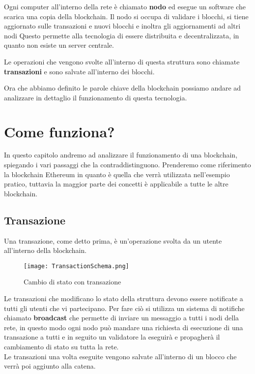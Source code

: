 Ogni computer all'interno della rete è chiamato \textbf{nodo} ed esegue un
software che scarica una copia della blockchain. Il nodo si occupa di validare
i blocchi, si tiene aggiornato sulle transazioni e nuovi blocchi e inoltra gli
aggiornamenti ad altri nodi Questo permette alla tecnologia di essere
distribuita e decentralizzata, in quanto non esiste un server centrale.

Le operazioni che vengono svolte all'interno di questa struttura sono chiamate
\textbf{transazioni} e sono salvate all'interno dei blocchi.

Ora che abbiamo definito le parole chiave della blockchain possiamo andare ad
analizzare in dettaglio il funzionamento di questa tecnologia.

\newpage

\section{Come funziona?}
In questo capitolo andremo ad analizzare il funzionamento di una blockchain,
spiegando i vari passaggi che la contraddistinguono. Prenderemo come
riferimento la blockchain Ethereum in quanto è quella che verrà utilizzata
nell'esempio pratico, tuttavia la maggior parte dei concetti è applicabile 
a tutte le altre blockchain.

\subsection{Transazione}
Una transazione, come detto prima, è un'operazione svolta da un utente
all'interno della blockchain. 

\begin{figure}[H]
    \centering
    \texttt{[image: TransactionSchema.png]} 
    \caption{Cambio di stato con transazione}
    \label{fig:transactionSchema}
\end{figure}

Le transazioni che modificano lo stato della struttura devono essere notificate
a tutti gli utenti che vi partecipano. Per fare ciò si utilizza un sistema di
notifiche chiamato \textbf{broadcast} che permette di inviare un messaggio a
tutti i nodi della rete, in questo modo ogni nodo può mandare una richiesta di
esecuzione di una transazione a tutti e in seguito un validatore la eseguirà e
propagherà il cambiamento di stato su tutta la rete. \\
Le transazioni una volta eseguite vengono salvate all'interno di un blocco che
verrà poi aggiunto alla catena.

